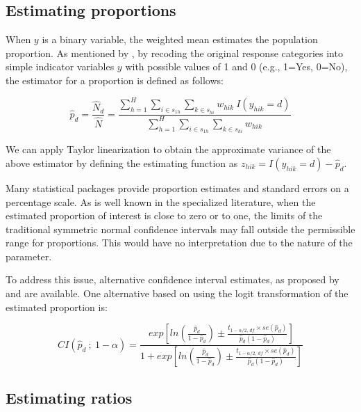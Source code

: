 \documentclass[
  12pt,
]{book}
\begin{document}
\hypertarget{estimating-proportions}{%
\subsection{Estimating proportions}\label{estimating-proportions}}

When \(y\) is a binary variable, the weighted mean estimates the population proportion. As mentioned by \citet{Heeringa2017}, by recoding the original response categories into simple indicator variables \(y\) with possible values of 1 and 0 (e.g., 1=Yes, 0=No), the estimator for a proportion is defined as follows:

\[
\widehat{p}_d = \frac{\widehat{N}_d}{\widehat{N}} = \frac{\sum_{h=1}^{H}\sum_{i \in s_{1h}} \sum_{ k \in s_{hi}} w_{hik}\ I(y_{hik} = d)} {\sum_{h=1}^{H}\sum_{i \in s_{1h}} \sum_{ k \in s_{hi}} w_{hik}}
\]

We can apply Taylor linearization to obtain the approximate variance of the above estimator by defining the estimating function as \(z_{hik} = I(y_{hik} = d) - \widehat{p}_d\).

Many statistical packages provide proportion estimates and standard errors on a percentage scale. As is well known in the specialized literature, when the estimated proportion of interest is close to zero or to one, the limits of the traditional symmetric normal confidence intervals may fall outside the permissible range for proportions. This would have no interpretation due to the nature of the parameter.

To address this issue, alternative confidence interval estimates, as proposed by \citet{Rust2007ConfidenceIF} and \citet{DeanPagano2015} are available. One alternative based on using the logit transformation of the estimated proportion is:

\[
CI \left( \widehat{p}_d \ ; \ 1 - \alpha \right) = \frac {exp \left[ ln \left( \frac{\widehat{p}_d} {1 - \widehat{p}_d} \right) \pm \frac{t_{1-\alpha/2 , \, df} \times se \left( \widehat{p}_d \right)} {\widehat{p}_d \left( 1 - \widehat{p}_d \right) } \right]} {1 + exp \left[ ln \left( \frac{\widehat{p}_d} {1 - \widehat{p}_d} \right) \pm \frac{t_{1-\alpha/2, \, df} \times se \left( \widehat{p}_d \right)} {\widehat{p}_d \left( 1 - \widehat{p}_d \right)}\right]}
\]

\hypertarget{estimating-ratios}{%
\subsection{Estimating ratios}\label{estimating-ratios}}
\end{document}
